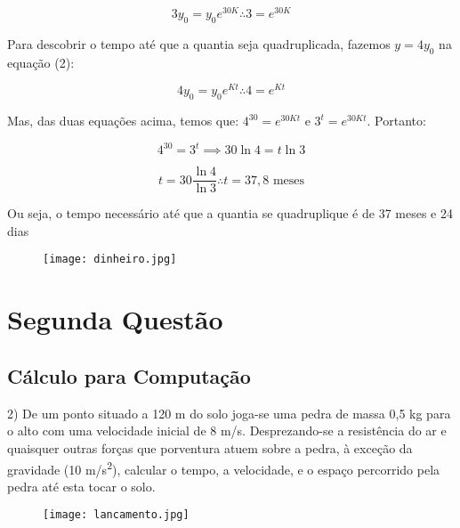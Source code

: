 \documentclass{beamer}
\begin{document}
	\begin{frame}
		\begin{displaymath}
			3y_0 = y_0e^{30K} \therefore 3 = e^{30K} 
		\end{displaymath} \pause
		
		Para descobrir o tempo até que a quantia seja quadruplicada, fazemos \(y = 4y_0\) na equação (2):
		
		\begin{displaymath}
 			4y_0 = y_0e^{Kt} \therefore 4 = e^{Kt} 
		\end{displaymath} \pause
		
		Mas, das duas equações acima, temos que: \( 4^{30} = e^{30Kt} \) e \( 3^t = e^{30Kt} \). Portanto:

		\begin{displaymath}
			4^{30} = 3^t \implies 30\ln 4 = t\ln 3
		\end{displaymath}
	\end{frame}

	\begin{frame}
		\begin{displaymath}
			t = 30 \frac{\ln 4}{\ln 3} \therefore t = 37,8 \text{ meses}
		\end{displaymath}
		
		Ou seja, o tempo necessário até que a quantia se quadruplique é de 37 meses e 24 dias
		
		\begin{figure}
			\centering
			\texttt{[image: dinheiro.jpg]}
			\label{}
		\end{figure}
	\end{frame}
	\setcounter{equation}{0}
	
	\section{Segunda Questão}
	\subsection{Cálculo para Computação}
	\begin{frame}
		2) De um ponto situado a 120 m do solo joga-se uma pedra de massa 0,5 kg para o alto com uma velocidade inicial de 8 m/s. Desprezando-se a resistência do ar e quaisquer outras forças que porventura atuem sobre a pedra, à exceção da gravidade (10 m/s\textsuperscript{2}), calcular o tempo, a velocidade, e o espaço percorrido pela pedra até esta tocar o solo.
		
		\begin{figure}
			\centering
			\texttt{[image: lancamento.jpg]}
			\label{}
		\end{figure}
	\end{frame}
\end{document}
